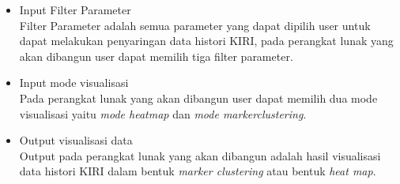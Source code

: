 \begin{itemize}
    \item Input Filter Parameter \\
    Filter Parameter adalah semua parameter yang  dapat dipilih user untuk dapat melakukan penyaringan data histori KIRI, pada perangkat lunak yang akan dibangun user dapat memilih tiga filter parameter.
    
    \item Input mode visualisasi \\
    Pada perangkat lunak yang akan dibangun user dapat memilih dua mode visualisasi yaitu \textit{mode heatmap} dan \textit{mode markerclustering}.
    
    \item Output visualisasi data \\
    Output pada perangkat lunak yang akan dibangun adalah hasil visualisasi data histori KIRI dalam bentuk \textit{marker clustering} atau bentuk \textit{heat map}.
\end{itemize}